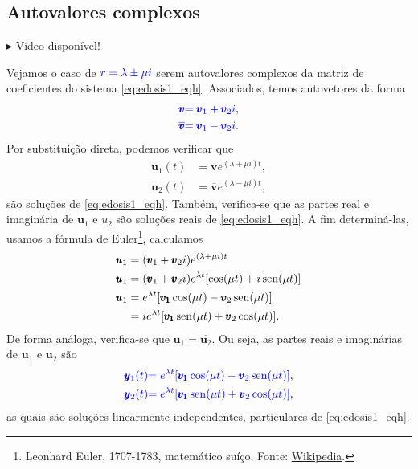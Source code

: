 \subsection{Autovalores complexos}

\begin{flushright}
  \href{https://archive.org/details/sistema-edos-autovalores-complexos}{$\blacktriangleright$ Vídeo disponível!}
\end{flushright}

Vejamos o caso de ${\color{blue}r=\lambda  \pm \mu i}$ serem autovalores complexos da matriz de coeficientes do sistema \eqref{eq:edosis1_eqh}. Associados, temos autovetores da forma
\begin{align}
  {\color{blue}\pmb{v}} &{\color{blue}= \pmb{v}_1 + \pmb{v}_2i},\\
  {\color{blue}\overline{\pmb{v}}} &{\color{blue}= \pmb{v}_1 - \pmb{v}_2i}.
\end{align}
Por substituição direta, podemos verificar que
\begin{align}
  \pmb{u}_1(t) &= \pmb{v}e^{(\lambda + \mu i)t},\\
  \pmb{u}_2(t) &= \overline{\pmb{v}}e^{(\lambda - \mu i)t},
\end{align}
são soluções de \eqref{eq:edosis1_eqh}. Também, verifica-se que as partes real e imaginária de $\pmb{u}_1$ e ${u}_2$ são soluções reais de \eqref{eq:edosis1_eqh}. A fim determiná-las, usamos a fórmula de Euler\footnote{Leonhard Euler, 1707-1783, matemático suíço. Fonte: \href{https://en.wikipedia.org/wiki/Leonhard_Euler}{Wikipedia}.}, calculamos
\begin{align}
  \pmb{u}_1 &= (\pmb{v}_1 + \pmb{v}_2i)e^{(\lambda + \mu i)t} \\
  \pmb{u}_1 &= (\pmb{v}_1 + \pmb{v}_2i)e^{\lambda t}[\cos(\mu t) + i\operatorname{sen}(\mu t)] \\
  \pmb{u}_1 &= e^{\lambda t}[\pmb{v_1}\cos(\mu t)-\pmb{v}_2\operatorname{sen}(\mu t)] \\
            &= ie^{\lambda t}[\pmb{v_1}\operatorname{sen}(\mu t) + \pmb{v}_2\cos(\mu t)].
\end{align}
De forma análoga, verifica-se que $\pmb{u}_1 = \overline{\pmb{u}_2}$. Ou seja, as partes reais e imaginárias de $\pmb{u}_1$ e $\pmb{u}_2$ são
\begin{align}
  {\color{blue}\pmb{y}_1(t)} &{\color{blue}= e^{\lambda t}[\pmb{v_1}\cos(\mu t)-\pmb{v}_2\operatorname{sen}(\mu t)]}, \\
  {\color{blue}\pmb{y}_2(t)} &{\color{blue}= e^{\lambda t}[\pmb{v_1}\operatorname{sen}(\mu t)+\pmb{v}_2\cos(\mu t)]},
\end{align}
as quais são soluções linearmente independentes, particulares de \eqref{eq:edosis1_eqh}.

